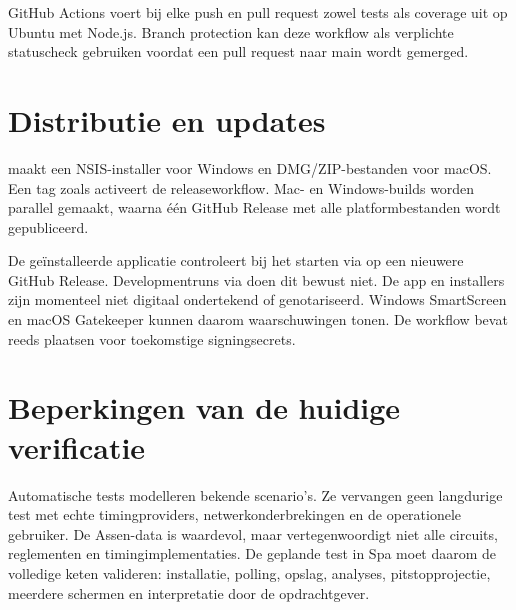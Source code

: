 GitHub Actions voert bij elke push en pull request zowel tests als coverage uit op Ubuntu met Node.js. Branch protection kan deze workflow als verplichte statuscheck gebruiken voordat een pull request naar main wordt gemerged.

\section{Distributie en updates}
 maakt een NSIS-installer voor Windows en DMG/ZIP-bestanden voor macOS. Een tag zoals  activeert de releaseworkflow. Mac- en Windows-builds worden parallel gemaakt, waarna één GitHub Release met alle platformbestanden wordt gepubliceerd.

De geïnstalleerde applicatie controleert bij het starten via  op een nieuwere GitHub Release. Developmentruns via  doen dit bewust niet. De app en installers zijn momenteel niet digitaal ondertekend of genotariseerd. Windows SmartScreen en macOS Gatekeeper kunnen daarom waarschuwingen tonen. De workflow bevat reeds plaatsen voor toekomstige signingsecrets.

\section{Beperkingen van de huidige verificatie}
Automatische tests modelleren bekende scenario's. Ze vervangen geen langdurige test met echte timingproviders, netwerkonderbrekingen en de operationele gebruiker. De Assen-data is waardevol, maar vertegenwoordigt niet alle circuits, reglementen en timingimplementaties. De geplande test in Spa moet daarom de volledige keten valideren: installatie, polling, opslag, analyses, pitstopprojectie, meerdere schermen en interpretatie door de opdrachtgever.

